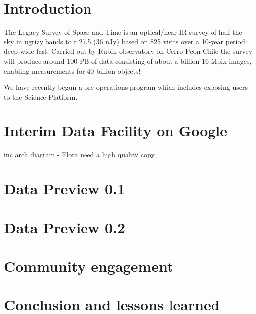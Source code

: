 \section{Introduction}

The Legacy Survey of Space and Time is an optical/near-IR survey of half the sky in ugrizy bands to r 27.5 (36 nJy) based on 825 visits over a 10-year period: deep wide fast.
Carried out by Rubin observatory on Cerro Pcon Chile the survey will produce around 100 PB of data consisting of about a billion 16 Mpix images, enabling measurements for 40 billion objects! \cite{arXiv:0805.2366}

We have recently begun a pre operations program which includes exposing users to the Science Platform.


\section{Interim Data Facility on Google }
inc arch diagram - Flora need a high quality copy

\section{Data Preview 0.1}


\section{Data Preview 0.2}

\section{Community engagement }

\section{Conclusion and lessons learned}



